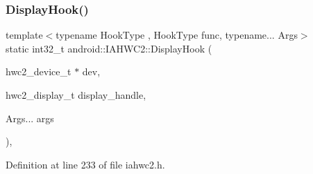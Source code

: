 \subsubsection{\texorpdfstring{Display\+Hook()}{DisplayHook()}}
{\footnotesize\ttfamily template$<$typename Hook\+Type , Hook\+Type func, typename... Args$>$ \\
static int32\+\_\+t android\+::\+I\+A\+H\+W\+C2\+::\+Display\+Hook (\begin{DoxyParamCaption}\item[{hwc2\+\_\+device\+\_\+t $\ast$}]{dev,  }\item[{hwc2\+\_\+display\+\_\+t}]{display\+\_\+handle,  }\item[{Args...}]{args }\end{DoxyParamCaption})\hspace{0.3cm}{\ttfamily [inline]}, {\ttfamily [static]}}



Definition at line 233 of file iahwc2.\+h.



